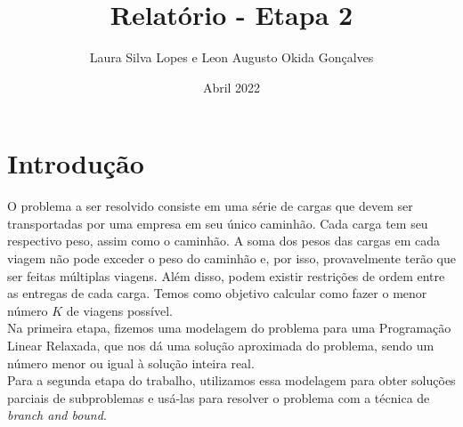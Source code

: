 \documentclass{article}
\title{Relatório - Etapa 2}
\author{Laura Silva Lopes e Leon Augusto Okida Gonçalves}
\date{Abril 2022}
\begin{document}
\maketitle

\section{Introdução}
O problema a ser resolvido consiste em uma série de cargas que devem ser transportadas por uma empresa em seu único caminhão. Cada carga tem seu respectivo peso, assim como o caminhão. A soma dos pesos das cargas em cada viagem não pode exceder o peso do caminhão e, por isso, provavelmente terão que ser feitas múltiplas viagens. Além disso, podem existir restrições de ordem entre as entregas de cada carga. Temos como objetivo calcular como fazer o menor número $K$ de viagens possível.\\
Na primeira etapa, fizemos uma modelagem do problema para uma Programação Linear Relaxada, que nos dá uma solução aproximada do problema, sendo um número menor ou igual à solução inteira real. \\
Para a segunda etapa do trabalho, utilizamos essa modelagem para obter soluções parciais de subproblemas e usá-las para resolver o problema com a técnica de \textit{branch and bound}. \\

\newpage
\end{document}
